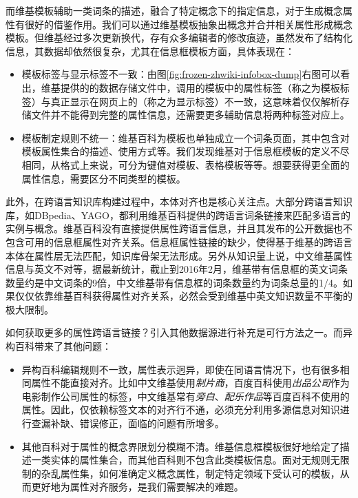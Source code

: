 而维基模板辅助一类词条的描述，融合了特定概念下的指定信息，对于生成概念属性有很好的借鉴作用。我们可以通过维基模板抽象出概念并合并相关属性形成概念模板。但维基经过多次更新换代，存有众多编辑者的修改痕迹，虽然发布了结构化信息，其数据却依然很复杂，尤其在信息框模板方面，具体表现在：
\begin{itemize}
\item {\heiti 模板标签与显示标签不一致}：由图\ref{fig:frozen-zhwiki-infobox-dump}右图可以看出，维基提供的的数据存储文件中，调用的模板中的属性标签（称之为模板标签）与真正显示在网页上的（称之为显示标签）不一致，这意味着仅仅解析存储文件并不能得到完整的属性信息，还需要更多辅助信息将两种标签对应上。
\item {\heiti 模板制定规则不统一}：维基百科为模板也单独成立一个词条页面，其中包含对模板属性集合的描述、使用方式等。我们发现维基对于信息框模板的定义不尽相同，从格式上来说，可分为键值对模板、表格模板等等。想要获得更全面的属性信息，需要区分不同类型的模板。
\end{itemize}

此外，在跨语言知识库构建过程中，本体对齐也是核心关注点。大部分跨语言知识库，如DBpedia、YAGO，都利用维基百科提供的跨语言词条链接来匹配多语言的实例与概念。维基百科没有直接提供属性跨语言信息，并且其发布的公开数据也不包含可用的信息框属性对齐关系。信息框属性链接的缺少，使得基于维基的跨语言本体在属性层无法匹配，知识库骨架无法形成。另外从知识量上说，中文维基属性信息与英文不对等，据最新统计，截止到2016年2月，维基带有信息框的英文词条数量约是中文词条的9倍，中文维基带有信息框的词条数量约为词条总量的1/4。如果仅仅依靠维基百科获得属性对齐关系，必然会受到维基中英文知识数量不平衡的极大限制。

如何获取更多的属性跨语言链接？引入其他数据源进行补充是可行方法之一。而异构百科带来了其他问题：
\begin{itemize}
\item {\heiti 异构百科编辑规则不一致}，属性表示迥异，即使在同语言情况下，也有很多相同属性不能直接对齐。比如中文维基使用\textit{制片商}，百度百科使用\textit{出品公司}作为电影制作公司属性的标签，中文维基常有\textit{旁白}、\textit{配乐作品}等百度百科不使用的属性。因此，仅依赖标签文本的对齐行不通，必须充分利用多源信息对知识进行查漏补缺、错误修正，面临的问题有所增多。
\item {\heiti 其他百科对于属性的概念界限划分模糊不清}。维基信息框模板很好地给定了描述一类实体的属性集合，而其他百科则不包含此类模板信息。面对无规则无限制的杂乱属性集，如何准确定义概念属性，制定特定领域下受认可的模板，从而更好地为属性对齐服务，是我们需要解决的难题。
\end{itemize}

